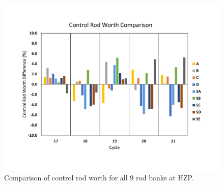 \documentclass[edeposit,fullpage,11pt]{uiucthesis2009}
\begin{document}
\begin{figure}
\begin{center}
\includegraphics[trim={0 2cm 0 2cm},clip,width=0.85\linewidth]{./Figures/crw_diff.pdf}
\end{center}
\caption{Comparison of control rod worth for all 9 rod banks at HZP.}
\label{fig:crw}
\end{figure} 
\end{document}
